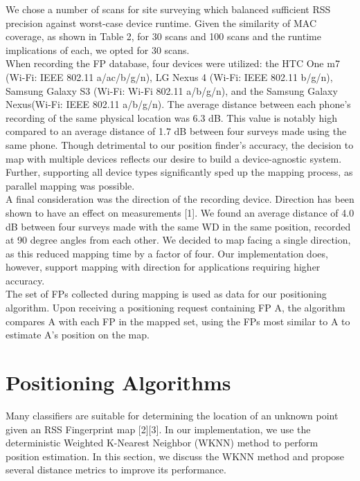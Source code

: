 \documentclass[conference]{IEEEtran}
\begin{document}
\indent We chose a number of scans for site surveying which balanced sufficient RSS precision against worst-case device runtime. Given the similarity of MAC coverage, as shown in Table 2, for 30 scans and 100 scans and the runtime implications of each, we opted for 30 scans.\\
\indent When recording the FP database, four devices were utilized: the HTC One m7 (Wi-Fi: IEEE 802.11 a/ac/b/g/n), LG Nexus 4  (Wi-Fi: IEEE 802.11 b/g/n), Samsung Galaxy S3 (Wi-Fi: Wi-Fi 802.11 a/b/g/n), and the Samsung Galaxy Nexus(Wi-Fi: IEEE 802.11 a/b/g/n). The average distance between each phone's recording of the same physical location was 6.3 dB. This value is notably high compared to an average distance of 1.7 dB between four surveys made using the same phone. Though detrimental to our position finder's accuracy, the decision to map with multiple devices reflects our desire to build a device-agnostic system. Further, supporting all device types significantly sped up the mapping process, as parallel mapping was possible.\\
\indent A final consideration was the direction of the recording device. Direction has been shown to have an effect on measurements [1]. We found an average distance of 4.0 dB between four surveys made with the same WD in the same position, recorded at 90 degree angles from each other. We decided to map facing a single direction, as this reduced mapping time by a factor of four. Our implementation does, however, support mapping with direction for applications requiring higher accuracy.\\
\indent The set of FPs collected during mapping is used as data for our positioning algorithm. Upon receiving a positioning request containing FP A, the algorithm compares A with each FP in the mapped set, using the FPs most similar to A to estimate A's position on the map.

\section{Positioning Algorithms}
Many classifiers are suitable for determining the location of an unknown point given an RSS Fingerprint map [2][3]. In our implementation, we use the deterministic Weighted K-Nearest Neighbor (WKNN) method to perform position estimation. In this section, we discuss the WKNN method and propose several distance metrics to improve its performance. 
\end{document}
